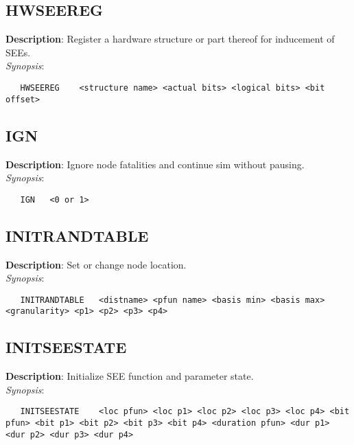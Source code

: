 \subsection{\bf HWSEEREG}
\label{manpages:HWSEEREG}
\label{manpages:hwseereg}
\vspace{-0.2in}
{\bf Description}: 	Register a hardware structure or part thereof for inducement of SEEs.\\[1.5ex]
{\em Synopsis}:
\vspace{-0.2in}
\scriptsize
\begin{verbatim}
   HWSEEREG    <structure name> <actual bits> <logical bits> <bit offset>	
\end{verbatim}
\normalsize
\vspace{-0.2in}


\subsection{\bf IGN}
\label{manpages:IGN}
\label{manpages:ign}
\vspace{-0.2in}
{\bf Description}: 	Ignore node fatalities and continue sim without pausing.\\[1.5ex]
{\em Synopsis}:
\vspace{-0.2in}
\scriptsize
\begin{verbatim}
   IGN   <0 or 1>	
\end{verbatim}
\normalsize
\vspace{-0.2in}


\subsection{\bf INITRANDTABLE}
\label{manpages:INITRANDTABLE}
\label{manpages:initrandtable}
\vspace{-0.2in}
{\bf Description}: 	Set or change node location.\\[1.5ex]
{\em Synopsis}:
\vspace{-0.2in}
\scriptsize
\begin{verbatim}
   INITRANDTABLE   <distname> <pfun name> <basis min> <basis max> <granularity> <p1> <p2> <p3> <p4>	
\end{verbatim}
\normalsize
\vspace{-0.2in}


\subsection{\bf INITSEESTATE}
\label{manpages:INITSEESTATE}
\label{manpages:initseestate}
\vspace{-0.2in}
{\bf Description}: 	Initialize SEE function and parameter state.\\[1.5ex]
{\em Synopsis}:
\vspace{-0.2in}
\scriptsize
\begin{verbatim}
   INITSEESTATE    <loc pfun> <loc p1> <loc p2> <loc p3> <loc p4> <bit pfun> <bit p1> <bit p2> <bit p3> <bit p4> <duration pfun> <dur p1> <dur p2> <dur p3> <dur p4>	
\end{verbatim}
\normalsize
\vspace{-0.2in}


